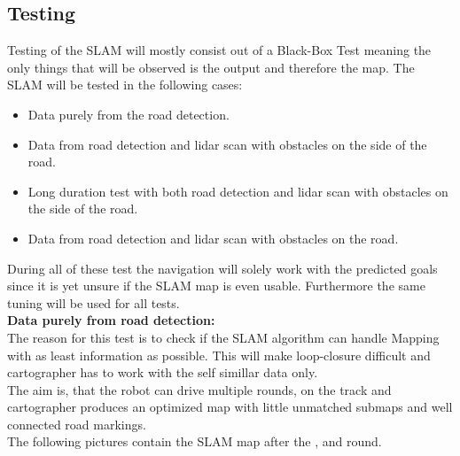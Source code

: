\subsection{Testing}
Testing of the SLAM will mostly consist out of a Black-Box Test meaning the only things that will be observed is the output and therefore the map.
The SLAM will be tested in the following cases:
\begin{itemize}
	\item Data purely from the road detection.
	\item Data from road detection and lidar scan with obstacles on the side of the road.
	\item Long duration test with both road detection and lidar scan with obstacles on the side of the road.
	\item Data from road detection and lidar scan with obstacles on the road.
\end{itemize}

During all of these test the navigation will solely work with the predicted goals since it is yet unsure if the SLAM map is even usable. Furthermore the same tuning will be used for all tests.\\

\textbf{Data purely from road detection:}\\
The reason for this test is to check if the SLAM algorithm can handle Mapping with as least information as possible. This will make loop-closure difficult and cartographer has to work with the self simillar data only.\\
The aim is, that the robot can drive multiple rounds, on the track and cartographer produces an optimized map with little unmatched submaps and well connected road markings.\\

The following pictures contain the SLAM map after the , and  round.\\

